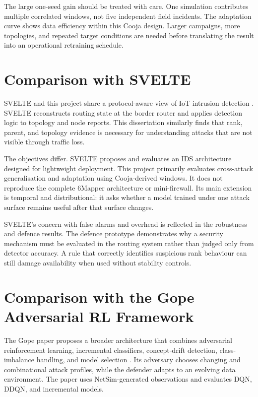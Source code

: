 The large one-seed gain should be treated with care. One simulation contributes multiple correlated windows, not five independent field incidents. The adaptation curve shows data efficiency within this Cooja design. Larger campaigns, more topologies, and repeated target conditions are needed before translating the result into an operational retraining schedule.

\section{Comparison with SVELTE}

SVELTE and this project share a protocol-aware view of IoT intrusion detection \cite{svelte2013}. SVELTE reconstructs routing state at the border router and applies detection logic to topology and node reports. This dissertation similarly finds that rank, parent, and topology evidence is necessary for understanding attacks that are not visible through traffic loss.

The objectives differ. SVELTE proposes and evaluates an IDS architecture designed for lightweight deployment. This project primarily evaluates cross-attack generalisation and adaptation using Cooja-derived windows. It does not reproduce the complete 6Mapper architecture or mini-firewall. Its main extension is temporal and distributional: it asks whether a model trained under one attack surface remains useful after that surface changes.

SVELTE's concern with false alarms and overhead is reflected in the robustness and defence results. The defence prototype demonstrates why a security mechanism must be evaluated in the routing system rather than judged only from detector accuracy. A rule that correctly identifies suspicious rank behaviour can still damage availability when used without stability controls.

\section{Comparison with the Gope Adversarial RL Framework}

The Gope paper proposes a broader architecture that combines adversarial reinforcement learning, incremental classifiers, concept-drift detection, class-imbalance handling, and model selection \cite{pasikhani2022arl}. Its adversary chooses changing and combinational attack profiles, while the defender adapts to an evolving data environment. The paper uses NetSim-generated observations and evaluates DQN, DDQN, and incremental models.

